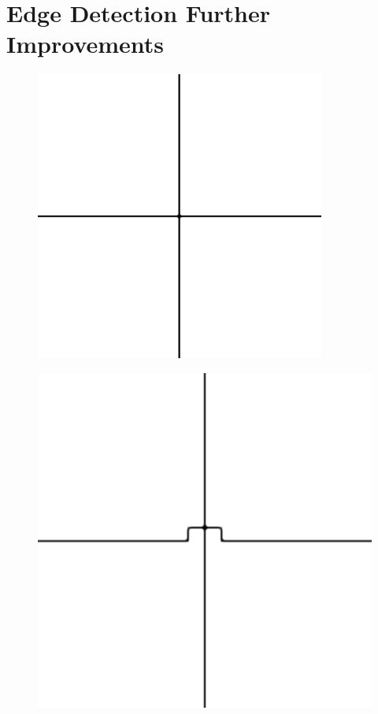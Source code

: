 \section{Edge Detection Further Improvements}
\label{sec:edge_detection_further_improvements}
\begin{figure}[htb]  \centering
    \begin{minipage}{0.15\textwidth}
        \centering
        \includegraphics[width=\textwidth]{pictures/intersection0.png}
        \label{fig:intersection0}
    \end{minipage}
    \hfill
    \begin{minipage}{0.15\textwidth}
        \centering
        \includegraphics[width=\textwidth]{pictures/intersection1.png}

\end{minipage}
\end{figure}
